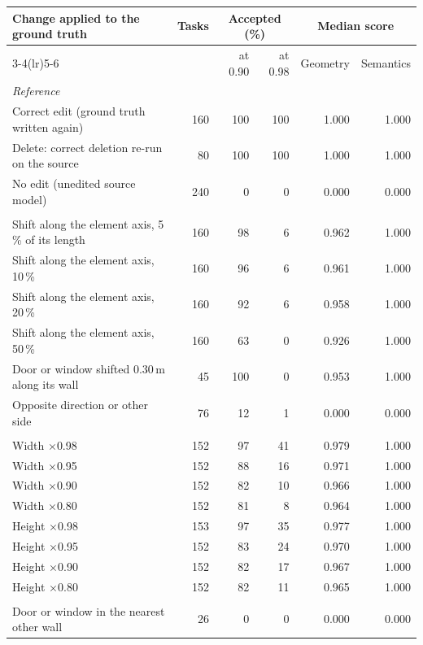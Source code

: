 \begin{tabular}{lrrrrr}
\toprule
Change applied to the ground truth & Tasks & \multicolumn{2}{c}{Accepted (\%)} & \multicolumn{2}{c}{Median score} \\
\cmidrule(lr){3-4}\cmidrule(lr){5-6}
 & & at 0.90 & at 0.98 & Geometry & Semantics \\
\midrule
\multicolumn{6}{l}{\textit{Reference}} \\
Correct edit (ground truth written again) & 160 & 100 & 100 & 1.000 & 1.000 \\
Delete: correct deletion re-run on the source & 80 & 100 & 100 & 1.000 & 1.000 \\
No edit (unedited source model) & 240 & 0 & 0 & 0.000 & 0.000 \\
\addlinespace
\multicolumn{6}{l}{\textit{Position}} \\
Shift along the element axis, 5\,\% of its length & 160 & 98 & 6 & 0.962 & 1.000 \\
Shift along the element axis, 10\,\% & 160 & 96 & 6 & 0.961 & 1.000 \\
Shift along the element axis, 20\,\% & 160 & 92 & 6 & 0.958 & 1.000 \\
Shift along the element axis, 50\,\% & 160 & 63 & 0 & 0.926 & 1.000 \\
Door or window shifted 0.30\,m along its wall & 45 & 100 & 0 & 0.953 & 1.000 \\
Opposite direction or other side & 76 & 12 & 1 & 0.000 & 0.000 \\
\addlinespace
\multicolumn{6}{l}{\textit{Dimension}} \\
Width $\times$0.98 & 152 & 97 & 41 & 0.979 & 1.000 \\
Width $\times$0.95 & 152 & 88 & 16 & 0.971 & 1.000 \\
Width $\times$0.90 & 152 & 82 & 10 & 0.966 & 1.000 \\
Width $\times$0.80 & 152 & 81 & 8 & 0.964 & 1.000 \\
Height $\times$0.98 & 153 & 97 & 35 & 0.977 & 1.000 \\
Height $\times$0.95 & 152 & 83 & 24 & 0.970 & 1.000 \\
Height $\times$0.90 & 152 & 82 & 17 & 0.967 & 1.000 \\
Height $\times$0.80 & 152 & 82 & 11 & 0.965 & 1.000 \\
\addlinespace
\multicolumn{6}{l}{\textit{Relation}} \\
Door or window in the nearest other wall & 26 & 0 & 0 & 0.000 & 0.000 \\

\end{tabular}
